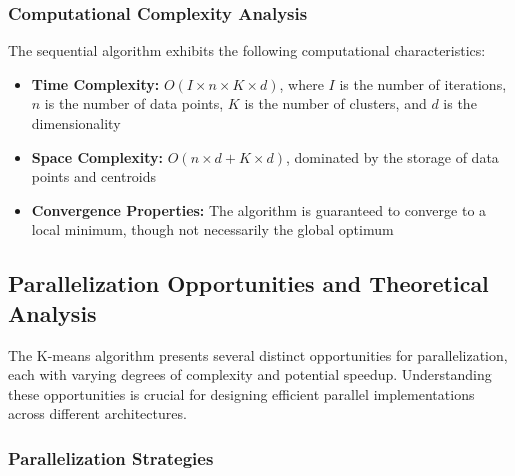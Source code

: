 \documentclass[12pt,a4paper]{article}
\begin{document}
\subsubsection{Computational Complexity Analysis}

The sequential algorithm exhibits the following computational characteristics:

\begin{itemize}
\item \textbf{Time Complexity:} $O(I \times n \times K \times d)$, where $I$ is the number of iterations, $n$ is the number of data points, $K$ is the number of clusters, and $d$ is the dimensionality
\item \textbf{Space Complexity:} $O(n \times d + K \times d)$, dominated by the storage of data points and centroids  
\item \textbf{Convergence Properties:} The algorithm is guaranteed to converge to a local minimum, though not necessarily the global optimum
\end{itemize}

\subsection{Parallelization Opportunities and Theoretical Analysis}

The K-means algorithm presents several distinct opportunities for parallelization, each with varying degrees of complexity and potential speedup. Understanding these opportunities is crucial for designing efficient parallel implementations across different architectures.

\subsubsection{Parallelization Strategies}
\end{document}
